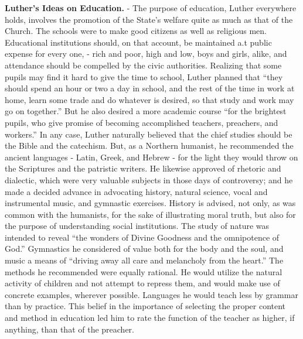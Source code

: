 \documentclass[
]{book}
\begin{document}
\textbf{Luther's Ideas on Education.} - The purpose of education, Luther everywhere holds, involves the promotion of the State's welfare quite as much as that of the Church. The schools were to make good citizens as well as religious men. Educational institutions should, on that account, be maintained a.t public expense for every one, - rich and poor, high and low, boys and girls, alike, and attendance should be compelled by the civic authorities. Realizing that some pupils may find it hard to give the time to school, Luther planned that ``they should spend an hour or two a day in school, and the rest of the time in work at home, learn some trade and do whatever is desired, so that study and work may go on together.'' But he also desired a more academic course ``for the brightest pupils, who give promise of becoming accomplished teachers, preachers, and workers.'' In any case, Luther naturally believed that the chief studies should be the Bible and the catechism. But, as a Northern humanist, he recommended the ancient languages - Latin, Greek, and Hebrew - for the light they would throw on the Scriptures and the patristic writers. He likewise approved of rhetoric and dialectic, which were very valuable subjects in those days of controversy; and he made a decided advance in advocating history, natural science, vocal and instrumental music, and gymnastic exercises. History is advised, not only, as was common with the humanists, for the sake of illustrating moral truth, but also for the purpose of understanding social institutions. The study of nature was intended to reveal ``the wonders of Divine Goodness and the omnipotence of God.'' Gymnastics he considered of value both for the body and the soul, and music a means of ``driving away all care and melancholy from the heart.'' The methods he recommended were equally rational. He would utilize the natural activity of children and not attempt to repress them, and would make use of concrete examples, wherever possible. Languages he would teach less by grammar than by practice. This belief in the importance of selecting the proper content and method in education led him to rate the function of the teacher as higher, if anything, than that of the preacher.
\end{document}
